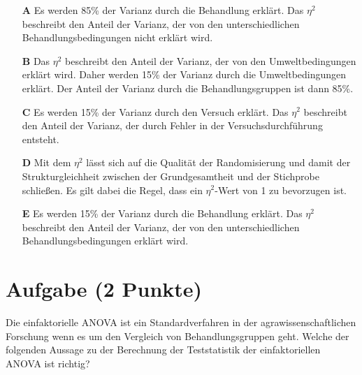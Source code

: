 \documentclass[a4paper, 9pt]{scrartcl}\usepackage[]{graphicx}\usepackage[]{xcolor}
\begin{document}
\begin{enumerate}
\item [\textbf{A} \msquare] Es werden 85\% der Varianz durch die Behandlung erklärt. Das $\eta^2$ beschreibt den Anteil der Varianz, der von den unterschiedlichen Behandlungsbedingungen nicht erklärt wird.
\item [\textbf{B} \msquare] Das $\eta^2$ beschreibt den Anteil der Varianz, der von den Umweltbedingungen erklärt wird. Daher werden 15\% der Varianz durch die Umweltbedingungen erklärt. Der Anteil der Varianz durch die Behandlungsgruppen ist dann 85\%.
\item [\textbf{C} \msquare] Es werden 15\% der Varianz durch den Versuch erklärt. Das $\eta^2$ beschreibt den Anteil der Varianz, der durch Fehler in der Versuchsdurchführung entsteht.
\item [\textbf{D} \msquare] Mit dem $\eta^2$ lässt sich auf die Qualität der Randomisierung und damit der Strukturgleichheit zwischen der Grundgesamtheit und der Stichprobe schließen. Es gilt dabei die Regel, dass ein $\eta^2$-Wert von 1 zu bevorzugen ist.
\item [\textbf{E} \msquare] Es werden 15\% der Varianz durch die Behandlung erklärt. Das $\eta^2$ beschreibt den Anteil der Varianz, der von den unterschiedlichen Behandlungsbedingungen erklärt wird.
\end{enumerate} 

\section{Aufgabe \hfill (2 Punkte)}



Die einfaktorielle ANOVA ist ein Standardverfahren in der agrawissenschaftlichen Forschung wenn es um den Vergleich von Behandlungsgruppen geht. Welche der folgenden Aussage zu der Berechnung der Teststatistik der einfaktoriellen ANOVA ist richtig?
\end{document}
